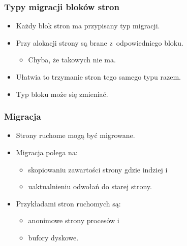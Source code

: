 \begin{frame}[fragile]
  \frametitle{Typy migracji bloków stron}

  \begin{itemize}
  \item Każdy blok stron ma przypisany typ migracji.
  \item Przy alokacji strony są brane z~odpowiedniego bloku.
    \begin{itemize}
    \item Chyba, że takowych nie ma.
    \end{itemize}
  \item Ułatwia to trzymanie stron tego samego typu razem.
  \item Typ bloku może się zmieniać.
  \end{itemize}
\end{frame}

\begin{frame}[fragile]
  \frametitle{Migracja}

  \begin{itemize}
  \item Strony ruchome mogą być migrowane.
  \item Migracja polega na:
    \begin{itemize}
    \item skopiowaniu zawartości strony gdzie indziej i
    \item uaktualnieniu odwołań do starej strony.
    \end{itemize}
  \item Przykładami stron ruchomych są:
    \begin{itemize}
    \item anonimowe strony procesów i
    \item bufory dyskowe.
    \end{itemize}
  \end{itemize}
\end{frame}
